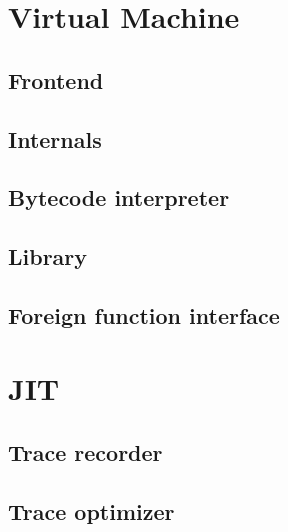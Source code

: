 \documentclass[12pt, oneside]{Thesis}
\begin{document}
  \chapter{Virtual Machine}
  \label{Chapt:VM}

    \section{Frontend}
    \label{Sec:frontend}
    

    \section{Internals}
    \label{Sec:Internals}
    

    \section{Bytecode interpreter}
    \label{Sec:BI}
    

    \section{Library}
    \label{Sec:Library}
    

    \section{Foreign function interface}
    \label{Sec:FFI}
    

  \chapter{JIT}
  \label{Chapt:JIT}

    \section{Trace recorder}
    \label{Sec:TR}
    

    \section{Trace optimizer}
    \label{Sec:TO}
    
\end{document}

